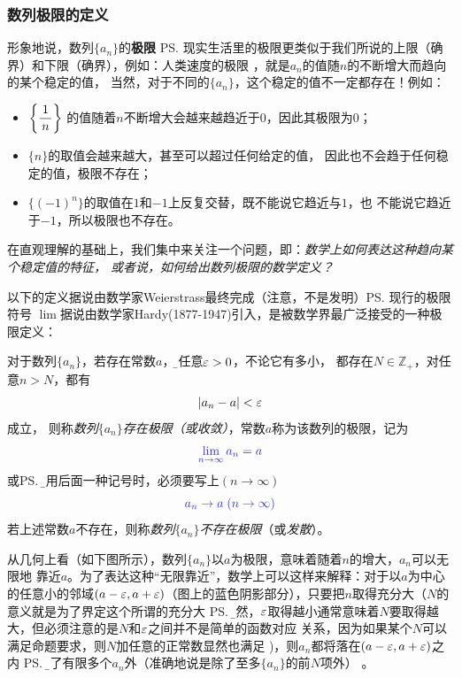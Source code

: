 \subsubsection{数列极限的定义}

形象地说，数列$\{a_n\}$的{\bf 极限}
\ps{现实生活里的极限更类似于我们所说的上限（确界）和下限（确界），例如：人类速度的极限}
，就是$a_n$的值随$n$的不断增大而趋向的某个稳定的值，
当然，对于不同的$\{a_n\}$，这个稳定的值不一定都存在！例如：
\begin{itemize}
  \item $\left\{\displaystyle\frac{\,{1}\,}{\,{n}\,}\right\}$
  的值随着$n$不断增大会越来越趋近于$0$，因此其极限为$0$；
  \item $\{n\}$的取值会越来越大，甚至可以超过任何给定的值，
  因此也不会趋于任何稳定的值，极限不存在；
  \item $\{(-1)^n\}$的取值在$1$和$-1$上反复交替，既不能说它趋近与$1$，也
  不能说它趋近于$-1$，所以极限也不存在。
\end{itemize}

在直观理解的基础上，我们集中来关注一个问题，即：{\it 数学上如何表达这种趋向某个稳定值的特征，
或者说，如何给出数列极限的数学定义？}

以下的定义据说由数学家Weierstrass最终完成（注意，不是发明）\ps{现行的极限符号
$\lim$据说由数学家Hardy(1877-1947)引入}，是被数学界最广泛接受的一种极限定义：

对于数列$\{a_n\}$，若存在常数$a$，{\b 对任意$\varepsilon>0$，不论它有多小，
都存在$N\in\mathbb{Z}_+$，对任意$n>N$，都有
$$|a_n-a|<\varepsilon$$
成立}，
则称{\it 数列$\{a_n\}$存在极限（或收敛）}，常数$a$称为该数列的极限，记为
$$\b\lim_{n\to\infty}a_n=a$$
或\ps{\b 使用后面一种记号时，必须要写上$(n\to\infty)$}
$$\b a_n\to a\;(n\to\infty)$$
若上述常数$a$不存在，则称{\it 数列$\{a_n\}$不存在极限}（或{\it 发散}）。

从几何上看（如下图所示），数列$\{a_n\}$以$a$为极限，意味着随着$n$的增大，$a_n$可以无限地
靠近$a$。为了表达这种“无限靠近”，数学上可以这样来解释：对于以$a$为中心的任意小的邻域$(a-\varepsilon,
a+\varepsilon)$（图上的蓝色阴影部分），只要把$n$取得充分大（$N$的意义就是为了界定这个所谓的充分大
\ps{\b 显然，$\varepsilon$取得越小通常意味着$N$要取得越大，但必须注意的是$N$和$\varepsilon$之间并不是简单的函数对应
关系，因为如果某个$N$可以满足命题要求，则$N$加任意的正常数显然也满足}
)，则$a_n$都将落在$(a-\varepsilon,a+\varepsilon)$之内
\ps{\b 除了有限多个$a_n$外（准确地说是除了至多$\{a_n\}$的前$N$项外）}
。

